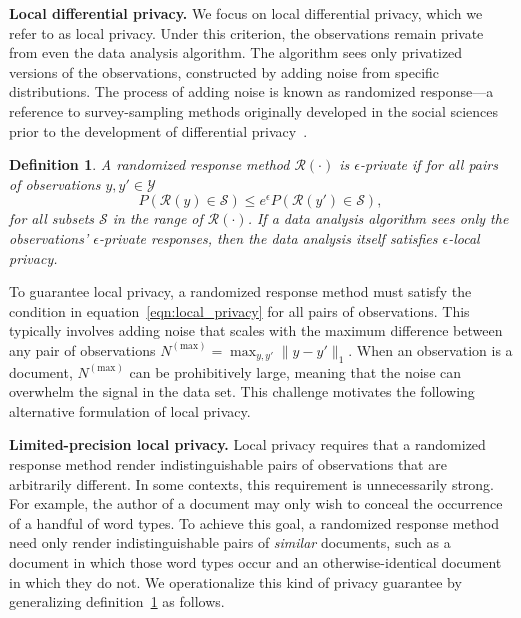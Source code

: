 \documentclass{article}
\newtheorem{definition}{Definition}
\newcommand{\tm}{\!-\!}
\begin{document}

\textbf{Local differential privacy.} We focus on local differential
privacy, which we refer to as local privacy. Under this criterion, the
observations remain private from even the data analysis algorithm. The
algorithm sees only privatized versions of the observations,
constructed by adding noise from specific distributions. The process
of adding noise is known as randomized response---a reference to
survey-sampling methods originally developed in the social sciences
prior to the development of differential
privacy~\citep{warner1965randomized}.

\begin{definition}
  \label{def:local_privacy}
A randomized response method $\mathcal{R}(\cdot)$ is $\epsilon$-private if for all pairs of observations $y, y' \in \mathcal{Y}$
\begin{equation}
  \label{eqn:local_privacy}
    P\left(\mathcal{R}(y) \in \mathcal{S}\right) \leq e^\epsilon
      P\left(\mathcal{R}(y') \in \mathcal{S}\right),
        \end{equation}
for all subsets $\mathcal{S}$ in the range of $\mathcal{R}(\cdot)$.
If a data analysis algorithm sees only the observations'
$\epsilon$-private responses, then the data analysis itself satisfies
$\epsilon$-local privacy.
\end{definition}

To guarantee local privacy, a randomized response method must satisfy
the condition in equation~\ref{eqn:local_privacy} for all pairs of
observations. This typically involves adding noise that scales with
the maximum difference between any pair of observations
$N^{(\textrm{max})} = \max_{y, y'}\|y \tm y'\|_1$. When an observation
is a document, $N^{(\textrm{max})}$ can be prohibitively large,
meaning that the noise can overwhelm the signal in the data set. This
challenge motivates the following alternative formulation of local
privacy.


\textbf{Limited-precision local privacy.} Local privacy requires that
a randomized response method render indistinguishable pairs of
observations that are arbitrarily different. In some contexts, this
requirement is unnecessarily strong. For example, the author of a
document may only wish to conceal the occurrence of a handful of word
types. To achieve this goal, a randomized response method need only
render indistinguishable pairs of \emph{similar} documents, such as a
document in which those word types occur and an otherwise-identical
document in which they do not. We operationalize this kind of
privacy guarantee by generalizing definition~\ref{def:local_privacy} as
follows.
\end{document}
